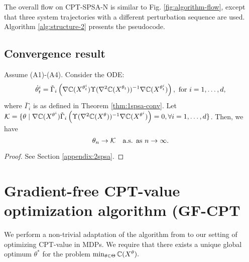 \documentclass[11pt,letterpaper,english]{article}
\begin{document}
The overall flow on CPT-SPSA-N is similar to Fig. \ref{fig:algorithm-flow}, except that three system trajectories with a different perturbation sequence are used. Algorithm \ref{alg:structure-2} presents the pseudocode.  

\subsection{Convergence result}
\begin{theorem}
\label{thm:2spsa}
Assume (A1)-(A4). 
Consider the ODE: 
$$
\dot\theta^{i}_t = \check\Gamma_{i}\left( \nabla \mathbb{C}(X^{\theta^{i}_t}) \Upsilon(\nabla^2 \mathbb{C}(X^{\theta_t}))^{-1} \nabla \mathbb{C}(X^{\theta^{i}_t}) \right), \text { for }i=1,\dots,d,$$
where 
$\bar\Gamma_{i}$ is as defined in Theorem \ref{thm:1spsa-conv}. Let $\mathcal{K} = \{\theta \mid
\nabla \mathbb{C}(X^{\theta^{i}})  \check\Gamma_{i}\left(\Upsilon(\nabla^2 \mathbb{C}(X^{\theta}))^{-1} \nabla \mathbb{C}(X^{\theta^{i}})\right)
=0, \forall i=1,\ldots,d\}$. Then,
we have
$$\theta_n \rightarrow \mathcal{K}  \text{~~ a.s. as } n\rightarrow \infty.$$ 
\end{theorem}
\begin{proof}
 See Section \ref{appendix:2spsa}.
\end{proof}

\section{Gradient-free CPT-value optimization algorithm (GF-CPT}
\label{sec:mras}
We perform a non-trivial adaptation of the algorithm from \cite{chang2013simulation} to our setting of optimizing CPT-value in MDPs.
We require that there exists a unique global optimum $\theta^*$ for the problem $\min_{\theta \in \Theta} \mathbb{C}(X^\theta).$
\end{document}
